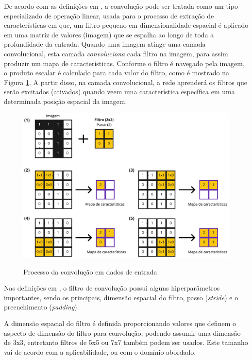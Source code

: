 \documentclass[
	12pt,				%
	oneside,			%
	a4paper,			%
	english,			%
	brazil				%
	]{abntex2ppgsi}
\begin{document}
De acordo com as definições em , a convolução pode ser tratada como um tipo especializado de operação linear, usada para o processo de extração de características em que, um filtro pequeno em dimensionalidade espacial é aplicado em uma matriz de valores (imagem) que se espalha ao longo de toda a profundidade da entrada. Quando uma imagem atinge uma camada convolucional, esta camada \textit{convoluciona} cada filtro na imagem, para assim produzir um mapa de características. Conforme o filtro é navegado pela imagem, o produto escalar é calculado para cada valor do filtro, como é mostrado na Figura \ref{fig:convolution_cnn}. A partir disso, na camada convolucional, a rede aprenderá os filtros que serão excitados (ativados) quando veem uma característica específica em uma determinada posição espacial da imagem.

\begin{figure}[H]
    \centering
    \caption{Processo da convolução em dados de entrada}
    \includegraphics[width=1.0\textwidth]{imagens/conceitos_basicos/convolution.jpg}
    \label{fig:convolution_cnn}
\end{figure}

Nas definições em , o filtro de convolução possui alguns hiperparâmetros importantes, sendo os principais, dimensão espacial do filtro, passo (\textit{stride}) e o preenchimento (\textit{padding}).

A dimensão espacial do filtro é definida proporcionando valores que definem o aspecto de dimensão do filtro para convolução, podendo assumir uma dimensão de 3x3, entretanto filtros de 5x5 ou 7x7 também podem ser usados. Este tamanho vai de acordo com a aplicabilidade, ou com o domínio abordado.
\end{document}
